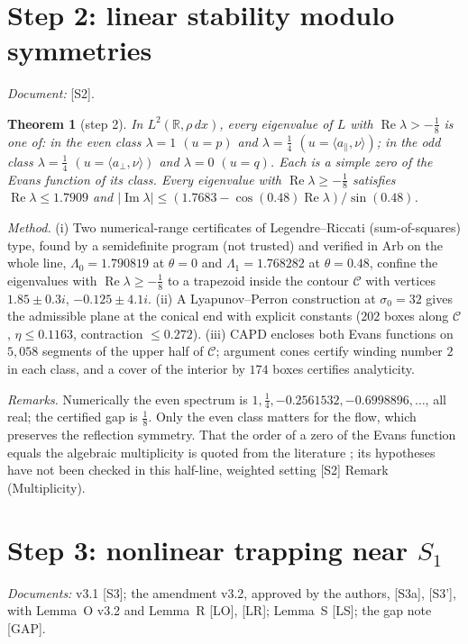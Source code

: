 \documentclass[11pt]{amsart}
\newtheorem{theorem}{Theorem}[section]
\theoremstyle{definition}
\theoremstyle{remark}
\newcommand{\R}{\mathbb{R}}
\newcommand{\ip}[2]{\langle #1,#2\rangle}
\newcommand{\dref}[1]{[\textsf{#1}]}
\begin{document}
\section{Step 2: linear stability modulo symmetries}\label{s:step2}
\emph{Document:} \dref{S2}.
\begin{theorem}[step 2]\label{thm:step2}
In $L^2(\R,\rho\,dx)$, every eigenvalue of $L$ with $\operatorname{Re}\lambda>-\frac18$ is one of: in the even class $\lambda=1$ $(u=p)$ and $\lambda=\frac14$ $(u=\ip{a_\parallel}\nu)$; in the odd class $\lambda=\frac14$ $(u=\ip{a_\perp}\nu)$ and $\lambda=0$ $(u=q)$. Each is a simple zero of the Evans function of its class. Every eigenvalue with $\operatorname{Re}\lambda\ge-\frac18$ satisfies $\operatorname{Re}\lambda\le1.7909$ and $|\operatorname{Im}\lambda|\le(1.7683-\cos(0.48)\operatorname{Re}\lambda)/\sin(0.48)$.
\end{theorem}
\emph{Method.} (i) Two numerical-range certificates of Legendre--Riccati (sum-of-squares) type, found by a semidefinite program (not trusted) and verified in Arb on the whole line, $\Lambda_0=1.790819$ at $\theta=0$ and $\Lambda_1=1.768282$ at $\theta=0.48$, confine the eigenvalues with $\operatorname{Re}\lambda\ge-\frac18$ to a trapezoid inside the contour $\mathcal C$ with vertices $1.85\pm0.3i$, $-0.125\pm4.1i$. (ii) A Lyapunov--Perron construction at $\sigma_0=32$ gives the admissible plane at the conical end with explicit constants ($202$ boxes along $\mathcal C$, $\eta\le0.1163$, contraction $\le0.272$). (iii) CAPD encloses both Evans functions on $5{,}058$ segments of the upper half of $\mathcal C$; argument cones certify winding number $2$ in each class, and a cover of the interior by $174$ boxes certifies analyticity.

\emph{Remarks.} Numerically the even spectrum is $1,\frac14,-0.2561532,-0.6998896,\dots$, all real; the certified gap is $\frac18$. Only the even class matters for the flow, which preserves the reflection symmetry. That the order of a zero of the Evans function equals the algebraic multiplicity is quoted from the literature \cite{AlexanderGardnerJones1990,KapitulaPromislow2013,LatushkinSukhtayev2010}; its hypotheses have not been checked in this half-line, weighted setting \dref{S2} Remark (Multiplicity).

\section{Step 3: nonlinear trapping near \texorpdfstring{$S_1$}{S1}}\label{s:step3}
\emph{Documents:} v3.1 \dref{S3}; the amendment v3.2, approved by the authors, \dref{S3a}, \dref{S3'}, with Lemma~O v3.2 and Lemma~R \dref{LO}, \dref{LR}; Lemma~S \dref{LS}; the gap note \dref{GAP}.
\end{document}
